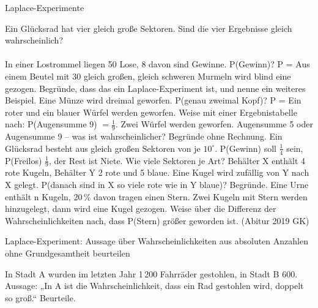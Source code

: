 \setcounter{aufgabe}{13}

\begin{aufgabe}{Laplace-Experimente}
\begin{teile}
\teil Ein Glücksrad hat vier gleich große Sektoren. Sind die vier Ergebnisse gleich wahrscheinlich?\\ \\ 
\teil In einer Lostrommel liegen 50 Lose, 8 davon sind Gewinne. P(Gewinn)? P = \leerfeld
\teil Aus einem Beutel mit 30 gleich großen, gleich schweren Murmeln wird blind eine gezogen. Begründe, dass das ein Laplace-Experiment ist, und nenne ein weiteres Beispiel.
\teil Eine Münze wird dreimal geworfen. P(genau zweimal Kopf)? P = \leerfeld
\teil Ein roter und ein blauer Würfel werden geworfen. Weise mit einer Ergebnistabelle nach: P(Augensumme 9) $= \frac{1}{9}$.
\teil Zwei Würfel werden geworfen. Augensumme 5 oder Augensumme 9 – was ist wahrscheinlicher? Begründe ohne Rechnung.
\teil Ein Glücksrad besteht aus gleich großen Sektoren von je $10^\circ$. P(Gewinn) soll $\frac{1}{4}$ sein, P(Freilos) $\frac{1}{9}$, der Rest ist Niete. Wie viele Sektoren je Art? \leerfeld
\teil Behälter X enthält 4 rote Kugeln, Behälter Y 2 rote und 5 blaue. Eine Kugel wird zufällig von Y nach X gelegt. P(danach sind in X so viele rote wie in Y blaue)? Begründe.
\teil Eine Urne enthält n Kugeln, 20\,\% davon tragen einen Stern. Zwei Kugeln mit Stern werden hinzugelegt, dann wird eine Kugel gezogen. Weise über die Differenz der Wahrscheinlichkeiten nach, dass P(Stern) größer geworden ist. \hfill (Abitur 2019 GK)
\end{teile}
\end{aufgabe}

\begin{aufgabe}{Laplace-Experiment: Aussage über Wahrscheinlichkeiten aus absoluten Anzahlen ohne Grundgesamtheit beurteilen}
\begin{teile}
\teil In Stadt A wurden im letzten Jahr 1\,200 Fahrräder gestohlen, in Stadt B 600. Aussage: „In A ist die Wahrscheinlichkeit, dass ein Rad gestohlen wird, doppelt so groß.“ Beurteile.
\end{teile}
\end{aufgabe}

